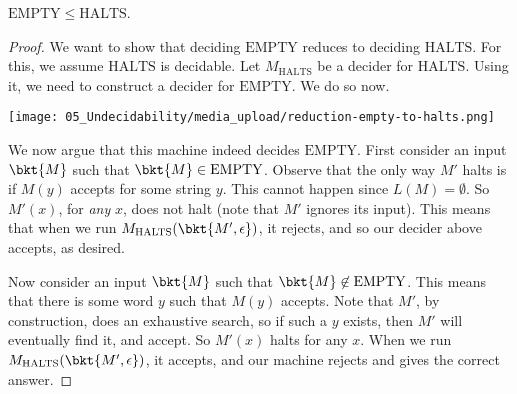 \begin{flex}
\begin{theorem} \label{theorem:mathrmEMPTY-leq-mathrmHALTS}
$\mathrm{EMPTY} \leq \mathrm{HALTS}$.
\end{theorem}

\begin{proof}
We want to show that deciding $\text{EMPTY}$ reduces to deciding $\text{HALTS}$. For this, we assume $\text{HALTS}$ is decidable. Let $M_\text{HALTS}$ be a decider for $\text{HALTS}$. Using it, we need to construct a decider for $\text{EMPTY}$. We do so now.

\begin{center}
\texttt{[image: 05\_Undecidability/media\_upload/reduction-empty-to-halts.png]}
\end{center}

We now argue that this machine indeed decides $\text{EMPTY}$. First consider an input $\bkt{M}$ such that $\bkt{M} \in \text{EMPTY}$. Observe that the only way $M'$ halts is if $M(y)$ accepts for some string $y$. This cannot happen since $L(M) = \emptyset$. So $M'(x)$, for \emph{any} $x$, does not halt (note that $M'$ ignores its input). This means that when we run $M_\text{HALTS}(\bkt{M', \epsilon})$, it rejects, and so our decider above accepts, as desired. 

Now consider an input $\bkt{M}$ such that $\bkt{M} \not \in \text{EMPTY}$. This means that there is some word $y$ such that $M(y)$ accepts. Note that $M'$, by construction, does an exhaustive search, so if such a $y$ exists, then $M'$ will eventually find it, and accept. So $M'(x)$ halts for any $x$. When we run $M_\text{HALTS}(\bkt{M', \epsilon})$, it accepts, and our machine rejects and gives the correct answer.
\end{proof}
\end{flex}

